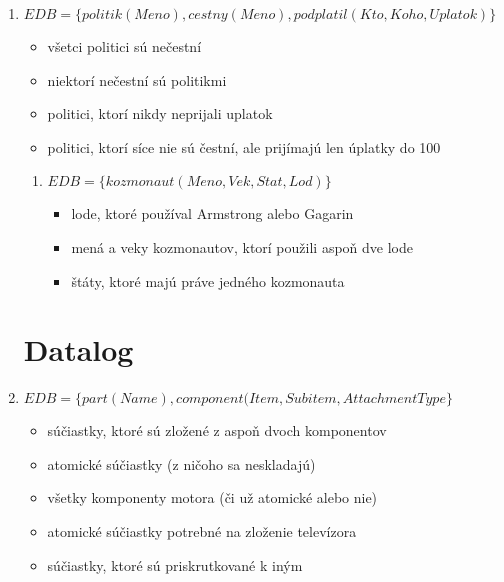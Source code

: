 \documentclass[10pt, a4paper]{article}
\begin{document}
\begin{enumerate}
\item
$EDB = \{politik(Meno), cestny(Meno), podplatil(Kto, Koho, Uplatok)\}$
\begin{itemize}
    \item všetci politici sú nečestní    
    \item niektorí nečestní sú politikmi
    \item politici, ktorí nikdy neprijali uplatok
    \item politici, ktorí síce nie sú čestní, ale prijímajú len úplatky do 100 
\end{itemize}

\begin{enumerate}
\item
$EDB = \{kozmonaut(Meno, Vek, Stat, Lod)\}$
\begin{itemize}
    \item lode, ktoré používal Armstrong alebo Gagarin
    \item mená a veky kozmonautov, ktorí použili aspoň dve lode
    \item štáty, ktoré majú práve jedného kozmonauta
\end{itemize}

\end{enumerate}



\section{Datalog}

\item 
$EDB = \{part(Name), component(Item, Subitem, AttachmentType\}$
\begin{itemize}
    \item súčiastky, ktoré sú zložené z aspoň dvoch komponentov
    \item atomické súčiastky (z ničoho sa neskladajú)
    \item všetky komponenty motora (či už atomické alebo nie)
    \item atomické súčiastky potrebné na zloženie televízora
    \item súčiastky, ktoré sú priskrutkované k iným
\end{itemize}


\end{enumerate}
\end{document}
